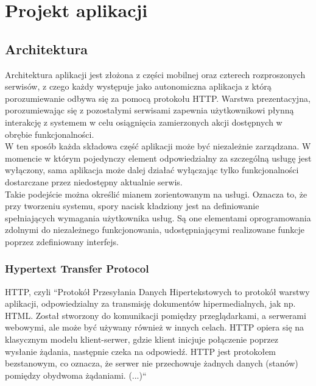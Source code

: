 \chapter{Projekt aplikacji}

\section{Architektura}

Architektura aplikacji jest złożona z części mobilnej oraz czterech rozproszonych serwisów, z czego każdy występuje jako autonomiczna aplikacja z którą porozumiewanie odbywa się za pomocą protokołu HTTP. Warstwa prezentacyjna, porozumiewając się z pozostałymi serwisami zapewnia użytkownikowi płynną interakcję z systemem w celu osiągnięcia zamierzonych akcji dostępnych w obrębie funkcjonalności.\\
W ten sposób każda składowa część aplikacji może być niezależnie zarządzana. W momencie w którym pojedynczy element odpowiedzialny za szczególną usługę jest wyłączony, sama aplikacja może dalej działać wyłączając tylko funkcjonalności dostarczane przez niedostępny aktualnie serwis.\\
\linebreak
Takie podejście można określić mianem zorientowanym na usługi. Oznacza to, że przy tworzeniu systemu, spory nacisk kładziony jest na definiowanie spełniających wymagania użytkownika usług. Są one elementami oprogramowania zdolnymi do niezależnego funkcjonowania, udostępniającymi realizowane funkcje poprzez zdefiniowany interfejs.

\subsection{Hypertext Transfer Protocol}
HTTP, czyli ``Protokół Przesyłania Danych Hipertekstowych to protokół warstwy aplikacji, odpowiedzialny za transmisję dokumentów hipermedialnych, jak np. HTML. Został stworzony do komunikacji pomiędzy przeglądarkami, a serwerami webowymi, ale może być używany również w innych celach. HTTP opiera się na klasycznym modelu klient-serwer, gdzie klient inicjuje połączenie poprzez wysłanie żądania, następnie czeka na odpowiedź. HTTP jest protokołem bezstanowym, co oznacza, że serwer nie przechowuje żadnych danych (stanów) pomiędzy obydwoma żądaniami. (...)``\cite{http}
\linebreak

